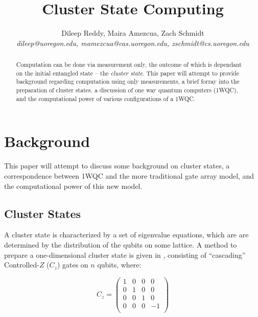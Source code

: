\documentclass[twocolumn]{IEEEtran11}
\begin{document}


\title{\Large \bf Cluster State Computing}
\author{
Dileep Reddy, Maira Amezcua, Zach Schmidt \\
{\em dileep@uoregon.edu, mamezcua@cas.uoregon.edu, zschmidt@cs.uoregon.edu }
}
\maketitle

\begin{abstract}
Computation can be done via measurement only, the outcome of which is dependant on the initial entangled state -- the \textit{cluster state}. This paper will attempt to provide background regarding computation using only measurements, a brief forray into the preparation of cluster states, a discussion of one way quantum computers (1WQC), and the computational power of various configurations of a 1WQC.
\end{abstract}


\section{Background}
This paper will attempt to discuss some background on cluster states, a correspondence between 1WQC and the more traditional gate array model, and the computational power of this new model.

\subsection{Cluster States}
A cluster state is characterized by a set of eigenvalue equations, which are are determined by the distribution of the qubits on some lattice\cite{briegel2001persistent}. A method to prepare a one-dimensional cluster state is given in \cite{jorrand2005unifying}, consisting of ``cascading'' Controlled-$Z$ ($C_z$) gates on $n$ qubits, where:

\[
C_z = 
\begin{pmatrix}
  1 & 0 & 0 & 0 \\
  0 & 1 & 0 & 0 \\
  0 & 0 & 1 & 0 \\
  0 & 0 & 0 & -1 \\
 \end{pmatrix}
\]
\end{document}

